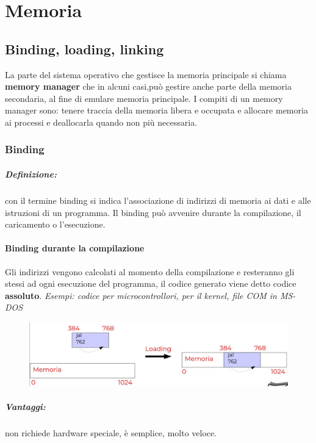 \chapter{Memoria}
\newpage

\section{Binding, loading, linking}

La parte del sistema operativo che gestisce la memoria principale si chiama \textbf{memory manager} che in alcuni casi,può gestire anche parte della memoria secondaria, al fine di emulare memoria principale.
I compiti di un memory manager sono: tenere traccia della memoria libera e occupata e allocare memoria ai processi e deallocarla quando non più necessaria.

\subsection{Binding}
\paragraph{Definizione:} con il termine binding si indica l'associazione di indirizzi di memoria ai dati e
alle istruzioni di un programma. Il binding può avvenire durante la compilazione, il caricamento o l'esecuzione.

\subsubsection{Binding durante la compilazione}
Gli indirizzi vengono calcolati al momento della compilazione e resteranno gli stessi ad ogni esecuzione del programma, il codice generato viene detto codice \textbf{assoluto}.
\textit{Esempi: codice per microcontrollori, per il kernel, file COM in MS-DOS}

\begin{figure} [h]
    \centering
    \includegraphics[width=0.7\linewidth]{Images/Screenshot 2025-01-16 at 18-28-27 so-05-memoria - so-05-memoria.pdf.png}
\end{figure}


\paragraph{Vantaggi:} non richiede hardware speciale, è semplice, molto veloce.
